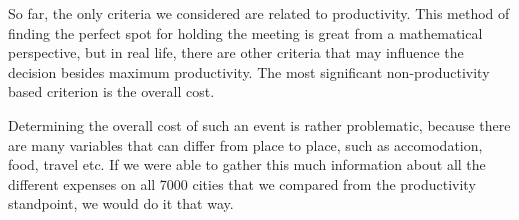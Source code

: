 
So far, the only criteria we considered are related to productivity. This method of finding the perfect spot for holding the meeting is great from a mathematical perspective, but in real life, there are other criteria that may influence the decision besides maximum productivity. The most significant non-productivity based criterion is the overall cost.

Determining the overall cost of such an event is rather problematic, because there are many variables that can differ from place to place, such as accomodation, food, travel etc. If we were able to gather this much information about all the different expenses on all 7000 cities that we compared from the productivity standpoint, we would do it that way. 

